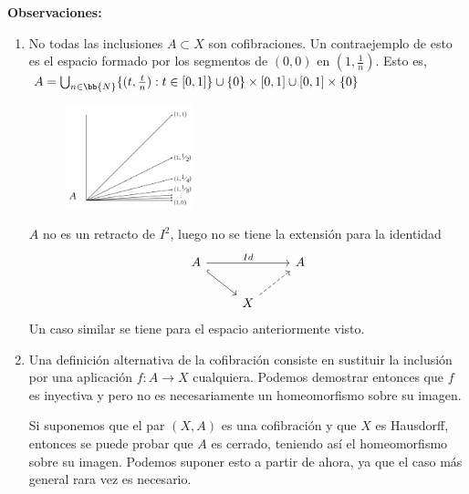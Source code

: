 \textbf{Observaciones:}
\begin{enumerate}
\item No todas las inclusiones $A \subset X$ son cofibraciones. Un contraejemplo de esto es el espacio formado por los segmentos de $(0, 0)$ en $(1, \frac{1}{n})$.
Esto es, $ A =  \bigcup_{n \in \bb{N}} \{ (t, \frac{t}{n}) : t \in [0,1] \} \cup \{0\} \times [0,1] \cup [0,1] \times \{0\} $ \par
\begin{figure}[h]
\centering
\includegraphics[width = 0.35\textwidth]{images/ejcofibsegmentos}
\end{figure}
$A$ no es un retracto de $I^2$, luego no se tiene la extensión para la identidad 
\[ 
\begin{tikzcd}
A \arrow{rr}{Id} \drar[hook] & & A \\
 & X \urar[dashed] &
\end{tikzcd}
\]
Un caso similar se tiene para el espacio anteriormente visto.

\item Una definición alternativa de la cofibración consiste en sustituir la inclusión por una aplicación $f : A \longrightarrow X $ cualquiera. Podemos demostrar entonces que $f$ es inyectiva y pero no es necesariamente un homeomorfismo sobre su imagen. \par
Si suponemos que el par $(X, A)$ es una cofibración y que $X$ es Hausdorff, entonces se puede probar que $A$ es cerrado, teniendo así el homeomorfismo sobre su imagen. Podemos suponer esto a partir de ahora, ya que el caso más general rara vez es necesario.
\end{enumerate}

